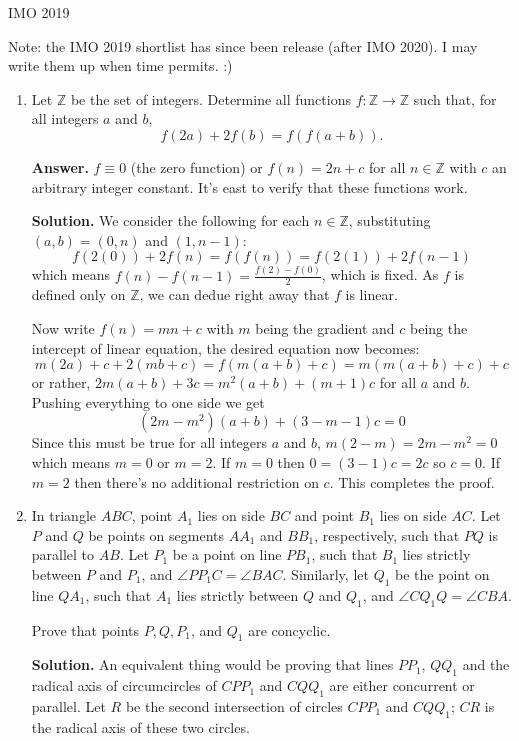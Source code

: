 \documentclass[11pt,a4paper]{article}
\newcommand{\bbZ}{\mathbb Z}
\newcommand{\<}{\langle}
\renewcommand{\>}{\rangle}
\begin{document}
\newcommand{\sgn}{\text{sgn}}
	\begin{center}
	\begin{Large}
		IMO 2019
	\end{Large}
	
\end{center}
Note: the IMO 2019 shortlist has since been release (after IMO 2020). I may write them up when time permits. :) 

\begin{enumerate}
	\item Let $\mathbb{Z}$ be the set of integers. Determine all functions $f: \mathbb{Z} \rightarrow \mathbb{Z}$ such that, for all integers $a$ and $b$, $$f(2a)+2f(b)=f(f(a+b)).$$
	
	\textbf{Answer.} $f\equiv 0$ (the zero function) or $f(n)=2n+c$ for all $n\in\bbZ$ with $c$ an arbitrary integer constant. It's east to verify that these functions work. 
	
	\textbf{Solution.} We consider the following for each $n\in\bbZ$, substituting $(a, b)=(0, n)$ and $(1, n-1)$: 
	\[
	f(2(0)) + 2f(n) = f(f(n)) = f(2(1))+2f(n-1)
	\]
	which means $f(n)-f(n-1)=\frac{f(2)-f(0)}{2}$, which is fixed. As $f$ is defined only on $\bbZ$, we can dedue right away that $f$ is linear. 
	
	Now write $f(n)=mn+c$ with $m$ being the gradient and $c$ being the intercept of linear equation, the desired equation now becomes: 
	\[m(2a)+c + 2(mb+c) = f(m(a+b)+c) = m(m(a+b)+c)+c
	\]
	or rather, $2m(a+b)+3c = m^2(a+b) + (m+1)c$ for all $a$ and $b$. Pushing everything to one side we get 
	\[
	(2m-m^2)(a+b)+(3-m-1)c = 0
	\]
	Since this must be true for all integers $a$ and $b$, $m(2-m)=2m-m^2=0$ which means $m=0$ or $m=2$. 
	If $m=0$ then $0=(3-1)c=2c$ so $c=0$. If $m=2$ then there's no additional restriction on $c$. This completes the proof. 
	
	\item In triangle $ABC$, point $A_1$ lies on side $BC$ and point $B_1$ lies on side $AC$. Let $P$ and $Q$ be points on segments $AA_1$ and $BB_1$, respectively, such that $PQ$ is parallel to $AB$. Let $P_1$ be a point on line $PB_1$, such that $B_1$ lies strictly between $P$ and $P_1$, and $\angle PP_1C=\angle BAC$. Similarly, let $Q_1$ be the point on line $QA_1$, such that $A_1$ lies strictly between $Q$ and $Q_1$, and $\angle CQ_1Q=\angle CBA$.
	
	Prove that points $P,Q,P_1$, and $Q_1$ are concyclic.
	
	\textbf{Solution.} An equivalent thing would be proving that lines $PP_1$, $QQ_1$ and the radical axis of circumcircles of $CPP_1$ and $CQQ_1$ are either concurrent or parallel. Let $R$ be the second intersection of circles $CPP_1$ and $CQQ_1$; $CR$ is the radical axis of these two circles. 
	

\end{enumerate}
\end{document}
